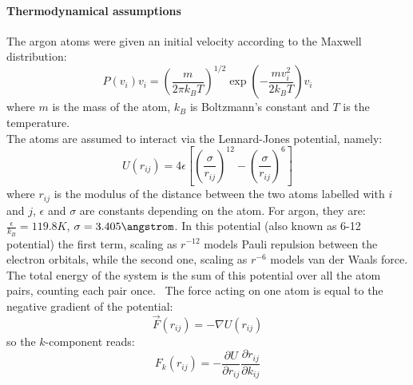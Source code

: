 \documentclass[10pt,a4paper,titlepage]{article}
\begin{document}
\paragraph*{Thermodynamical assumptions}
\noindent The argon atoms were given an initial velocity according to the Maxwell distribution: 
\begin {equation}
P(v_i){v_i} = \left(\frac{m}{2\pi k_B T}\right)^{1/2} \exp\left(-\frac{m v_i^2}{2k_B T}\right) {v_i}
\end{equation}
where $m$ is the mass of the atom, $k_B$ is Boltzmann's constant and $T$ is the temperature.
\\The atoms are assumed to interact via the Lennard-Jones potential, namely:
\begin{equation}
U(r_{ij}) = 4\epsilon\left[\left(\frac{\sigma}{r_{ij}}\right)^{12} - \left(\frac{\sigma}{r_{ij}}\right)^6\right]
\end{equation}
where $r_{ij}$ is the modulus of the distance between the two atoms labelled with $i$ and $j$, $\epsilon$ and $\sigma$ are constants depending on the atom. For argon, they are: $\frac{\epsilon}{k_{B}} = 119.8 K$, $\sigma = 3.405 \angstrom$. In this potential (also known as 6-12 potential) the first term, scaling as $r^{-12}$ models Pauli repulsion between the electron orbitals, while the second one, scaling as $r^{-6}$ models van der Waals force. 
\\The total energy of the system is the sum of this potential over all the atom pairs, counting each pair once.
\ The force acting on one atom is equal to the negative gradient of the potential: 
\begin{equation}
\vec F(r_{ij}) = -\nabla U(r_{ij})
\end{equation}
so the $k$-component reads:
\begin{equation}
F_k(r_{ij}) = -\frac{\partial U}{\partial r_{ij}}\frac{\partial r_{ij}}{\partial k_{ij}}
\end{equation}
\end{document}
